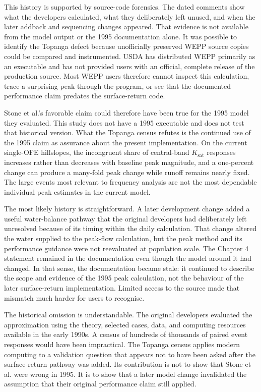 \documentclass[11pt]{article}
\newcommand{\Ksat}{\ensuremath{K_{\mathrm{sat}}}}
\begin{document}
This history is supported by source-code forensics. The dated comments show
what the developers calculated, what they deliberately left unused, and when
the later addback and sequencing changes appeared. That evidence is not
available from the model output or the 1995 documentation alone. It was
possible to identify the Topanga defect because unofficially preserved WEPP
source copies could be compared and instrumented. USDA has distributed WEPP
primarily as an executable and has not provided users with an official,
complete release of the production source. Most WEPP users therefore cannot
inspect this calculation, trace a surprising peak through the program, or see
that the documented performance claim predates the surface-return code.

Stone et al.'s favorable claim could therefore have been true for the 1995
model they evaluated. This study does not have a 1995 executable and does not
test that historical version. What the Topanga census refutes is the continued
use of the 1995 claim as assurance about the present implementation. On the
current single-OFE hillslopes, the incongruent share of central-band \Ksat{}
responses increases rather than decreases with baseline peak magnitude, and a
one-percent change can produce a many-fold peak change while runoff remains
nearly fixed. The large events most relevant to frequency analysis are not the
most dependable individual peak estimates in the current model.

The most likely history is straightforward. A later development change added
a useful water-balance pathway that the original developers had deliberately
left unresolved because of its timing within the daily calculation. That
change altered the water supplied to the peak-flow calculation, but the peak
method and its performance guidance were not reevaluated at population scale.
The Chapter 4 statement remained in the documentation even though the model
around it had changed. In that sense, the documentation became stale: it
continued to describe the scope and evidence of the 1995 peak calculation, not
the behaviour of the later surface-return implementation. Limited access to the
source made that mismatch much harder for users to recognise.

The historical omission is understandable. The original developers evaluated
the approximation using the theory, selected cases, data, and computing
resources available in the early 1990s. A census of hundreds of thousands of
paired event responses would have been impractical. The Topanga census applies
modern computing to a validation question that appears not to have been asked
after the surface-return pathway was added. Its contribution is not to show
that Stone et al. were wrong in 1995. It is to show that a later model change
invalidated the assumption that their original performance claim still applied.
\end{document}
